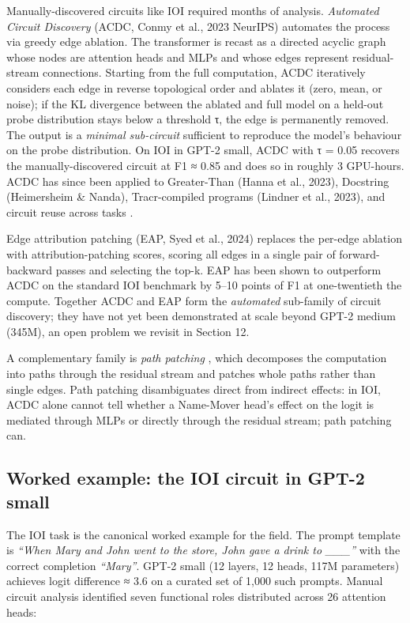 \documentclass{article}
\begin{document}
Manually-discovered circuits like IOI required months of analysis. \emph{Automated Circuit Discovery} (ACDC, Conmy et al., 2023 NeurIPS) automates the process via greedy edge ablation. The transformer is recast as a directed acyclic graph whose nodes are attention heads and MLPs and whose edges represent residual-stream connections. Starting from the full computation, ACDC iteratively considers each edge in reverse topological order and ablates it (zero, mean, or noise); if the KL divergence between the ablated and full model on a held-out probe distribution stays below a threshold τ, the edge is permanently removed. The output is a \emph{minimal sub-circuit} sufficient to reproduce the model's behaviour on the probe distribution. On IOI in GPT-2 small, ACDC with τ = 0.05 recovers the manually-discovered circuit at F1 ≈ 0.85 and does so in roughly 3 GPU-hours. ACDC has since been applied to Greater-Than (Hanna et al., 2023), Docstring (Heimersheim \& Nanda), Tracr-compiled programs (Lindner et al., 2023), and circuit reuse across tasks \citep{merullo2023circuitcomponentre}.

Edge attribution patching (EAP, Syed et al., 2024) replaces the per-edge ablation with attribution-patching scores, scoring all edges in a single pair of forward-backward passes and selecting the top-k. EAP has been shown to outperform ACDC on the standard IOI benchmark by 5--10 points of F1 at one-twentieth the compute. Together ACDC and EAP form the \emph{automated} sub-family of circuit discovery; they have not yet been demonstrated at scale beyond GPT-2 medium (345M), an open problem we revisit in Section 12.

A complementary family is \emph{path patching} \citep{wang2023scottselfconsisten}, which decomposes the computation into paths through the residual stream and patches whole paths rather than single edges. Path patching disambiguates direct from indirect effects: in IOI, ACDC alone cannot tell whether a Name-Mover head's effect on the logit is mediated through MLPs or directly through the residual stream; path patching can.

\subsection{Worked example: the IOI circuit in GPT-2 small}\label{worked-example-the-ioi-circuit-in-gpt-2-small}

The IOI task \citep{wang2022interpretabilityin} is the canonical worked example for the field. The prompt template is \emph{``When Mary and John went to the store, John gave a drink to \_\_\_''} with the correct completion \emph{``Mary''}. GPT-2 small (12 layers, 12 heads, 117M parameters) achieves logit difference ≈ 3.6 on a curated set of 1,000 such prompts. Manual circuit analysis identified seven functional roles distributed across 26 attention heads:
\end{document}
